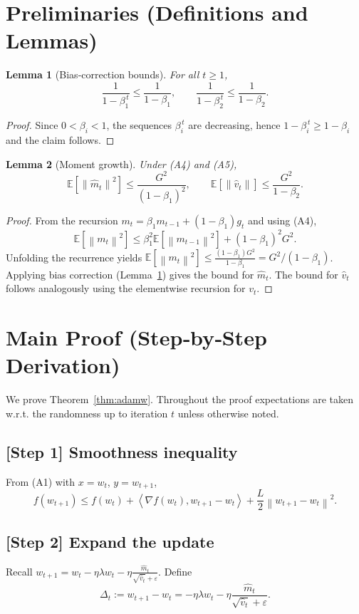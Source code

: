 \documentclass{article}
\newtheorem{lemma}{Lemma}
\newcommand{\EE}{\mathbb{E}}
\newcommand{\norm}[1]{\left\| #1\right\|}
\newcommand{\inner}[2]{\left\langle #1,#2\right\rangle}
\begin{document}
\section*{Preliminaries (Definitions and Lemmas)}
\begin{lemma}[Bias‑correction bounds]\label{lem:bias}
For all $t\ge1$,
\[
\frac{1}{1-\beta_1^{\,t}}\le \frac{1}{1-\beta_1},\qquad
\frac{1}{1-\beta_2^{\,t}}\le \frac{1}{1-\beta_2}.
\]
\end{lemma}
\begin{proof}
Since $0<\beta_i<1$, the sequences $\beta_i^{\,t}$ are decreasing, hence $1-\beta_i^{\,t}\ge 1-\beta_i$ and the claim follows. \qedhere
\end{proof}

\begin{lemma}[Moment growth]\label{lem:moments}
Under (A4) and (A5),
\[
\EE\!\left[\norm{\hat m_t}^2\right]\le \frac{G^2}{(1-\beta_1)^2},
\qquad
\EE\!\left[\norm{\hat v_t}\right]\le \frac{G^2}{1-\beta_2}.
\]
\end{lemma}
\begin{proof}
From the recursion $m_t=\beta_1 m_{t-1}+(1-\beta_1)g_t$ and using (A4),
\[
\EE[\norm{m_t}^2]\le \beta_1^2\EE[\norm{m_{t-1}}^2]+(1-\beta_1)^2G^2.
\]
Unfolding the recurrence yields $\EE[\norm{m_t}^2]\le \frac{(1-\beta_1)G^2}{1-\beta_1}=G^2/(1-\beta_1)$. Applying bias correction (Lemma~\ref{lem:bias}) gives the bound for $\hat m_t$. The bound for $\hat v_t$ follows analogously using the elementwise recursion for $v_t$. \qedhere
\end{proof}

\section*{Main Proof (Step‑by‑Step Derivation)}
We prove Theorem~\ref{thm:adamw}. Throughout the proof expectations are taken w.r.t. the randomness up to iteration $t$ unless otherwise noted.

\subsection*{[Step 1] Smoothness inequality}
From (A1) with $x=w_t$, $y=w_{t+1}$,
\[
f(w_{t+1})\le f(w_t) + \inner{\nabla f(w_t)}{w_{t+1}-w_t}
+ \frac{L}{2}\norm{w_{t+1}-w_t}^2 . \tag{1}
\]

\subsection*{[Step 2] Expand the update}
Recall $w_{t+1}=w_t-\eta\lambda w_t-\eta\frac{\hat m_t}{\sqrt{\hat v_t}+\varepsilon}$.
Define
\[
\Delta_t:= w_{t+1}-w_t = -\eta\lambda w_t -\eta\frac{\hat m_t}{\sqrt{\hat v_t}+\varepsilon}. \tag{2}
\]
\end{document}
